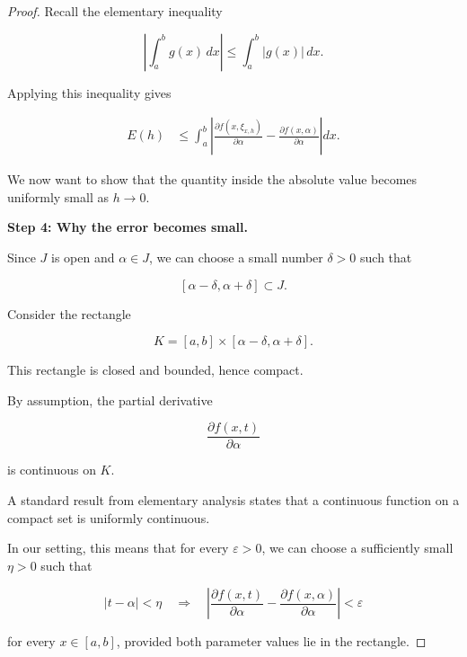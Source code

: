 \documentclass[11pt,a4paper]{article}
\theoremstyle{definition}
\theoremstyle{remark}
\begin{document}
\begin{proof}
Recall the elementary
inequality

\begin{equation}
    \left|
    \int_a^b g(x)\,dx
    \right|
    \leq
    \int_a^b |g(x)|\,dx.
    \label{eq:integral_absolute_inequality}
\end{equation}

Applying this inequality gives

\begin{align}
    E(h)
    &\leq
    \int_a^b
    \left|
    \frac{\partial f(x,\xi_{x,h})}
         {\partial\alpha}
    -
    \frac{\partial f(x,\alpha)}
         {\partial\alpha}
    \right|dx.
    \label{eq:leibniz_error_bound}
\end{align}

We now want to show that
the quantity inside the
absolute value becomes
uniformly small as
$h\to0$.

\medskip

\textbf{Step 4: Why the error becomes small.}

Since $J$ is open and
$\alpha\in J$, we can
choose a small number
$\delta>0$ such that

\[
    [\alpha-\delta,\alpha+\delta]
    \subset J.
\]

Consider the rectangle

\[
    K=
    [a,b]\times
    [\alpha-\delta,\alpha+\delta].
\]

This rectangle is closed
and bounded, hence compact.

By assumption, the partial
derivative

\[
    \frac{\partial f(x,t)}
         {\partial\alpha}
\]

is continuous on $K$.

A standard result from
elementary analysis states
that a continuous function
on a compact set is
uniformly continuous.

In our setting, this means
that for every $\varepsilon>0$,
we can choose a sufficiently
small $\eta>0$ such that

\begin{equation}
    |t-\alpha|<\eta
    \quad\Longrightarrow\quad
    \left|
    \frac{\partial f(x,t)}
         {\partial\alpha}
    -
    \frac{\partial f(x,\alpha)}
         {\partial\alpha}
    \right|
    <\varepsilon
    \label{eq:leibniz_uniform_continuity}
\end{equation}

for every $x\in[a,b]$,
provided both parameter
values lie in the rectangle.


\end{proof}
\end{document}
